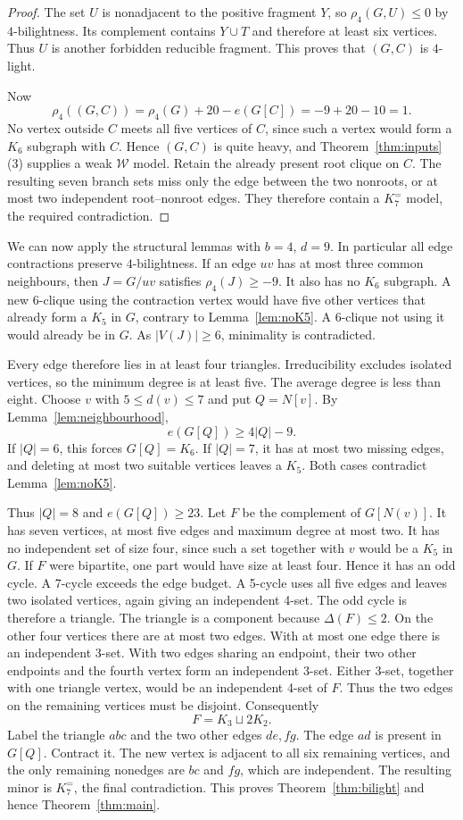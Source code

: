 \documentclass[11pt]{article}
\theoremstyle{remark}
\numberwithin{equation}{section}
\newcommand{\Ke}{K_7^{=}}
\newcommand{\W}{\mathcal W}
\begin{document}
\begin{proof}
The set $U$ is nonadjacent to the positive fragment $Y$, so $\rho_4(G,U)\le0$ by $4$-bilightness. Its complement contains $Y\cup T$ and therefore at least six vertices. Thus $U$ is another forbidden reducible fragment. This proves that $(G,C)$ is $4$-light.

Now
\[
\rho_4((G,C))=\rho_4(G)+20-e(G[C])=-9+20-10=1.
\]
No vertex outside $C$ meets all five vertices of $C$, since such a vertex would form a $K_6$ subgraph with $C$. Hence $(G,C)$ is quite heavy, and Theorem~\ref{thm:inputs}(3) supplies a weak $\W$ model. Retain the already present root clique on $C$. The resulting seven branch sets miss only the edge between the two nonroots, or at most two independent root--nonroot edges. They therefore contain a $\Ke$ model, the required contradiction.
\end{proof}
We can now apply the structural lemmas with $b=4$, $d=9$. In particular all edge contractions preserve $4$-bilightness. If an edge $uv$ has at most three common neighbours, then $J=G/uv$ satisfies $\rho_4(J)\ge-9$. It also has no $K_6$ subgraph. A new 6-clique using the contraction vertex would have five other vertices that already form a $K_5$ in $G$, contrary to Lemma~\ref{lem:noK5}. A 6-clique not using it would already be in $G$. As $|V(J)|\ge6$, minimality is contradicted.

Every edge therefore lies in at least four triangles. Irreducibility excludes isolated vertices, so the minimum degree is at least five. The average degree is less than eight. Choose $v$ with $5\le d(v)\le7$ and put $Q=N[v]$. By Lemma~\ref{lem:neighbourhood},
\begin{equation}\label{eq:criticalQ}
e(G[Q])\ge4|Q|-9.
\end{equation}
If $|Q|=6$, this forces $G[Q]=K_6$. If $|Q|=7$, it has at most two missing edges, and deleting at most two suitable vertices leaves a $K_5$. Both cases contradict Lemma~\ref{lem:noK5}.

Thus $|Q|=8$ and $e(G[Q])\ge23$. Let $F$ be the complement of $G[N(v)]$. It has seven vertices, at most five edges and maximum degree at most two. It has no independent set of size four, since such a set together with $v$ would be a $K_5$ in $G$. If $F$ were bipartite, one part would have size at least four. Hence it has an odd cycle. A 7-cycle exceeds the edge budget. A 5-cycle uses all five edges and leaves two isolated vertices, again giving an independent 4-set. The odd cycle is therefore a triangle. The triangle is a component because $\Delta(F)\le2$. On the other four vertices there are at most two edges. With at most one edge there is an independent 3-set. With two edges sharing an endpoint, their two other endpoints and the fourth vertex form an independent 3-set. Either 3-set, together with one triangle vertex, would be an independent 4-set of $F$. Thus the two edges on the remaining vertices must be disjoint. Consequently
\[
F=K_3\sqcup2K_2.
\]
Label the triangle $abc$ and the two other edges $de,fg$. The edge $ad$ is present in $G[Q]$. Contract it. The new vertex is adjacent to all six remaining vertices, and the only remaining nonedges are $bc$ and $fg$, which are independent. The resulting minor is $\Ke$, the final contradiction. This proves Theorem~\ref{thm:bilight} and hence Theorem~\ref{thm:main}.
\end{document}
